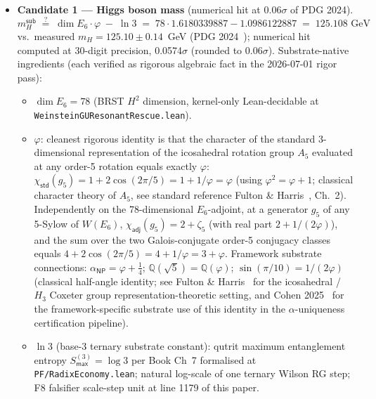 \documentclass[11pt,a4paper]{amsart}
\theoremstyle{plain}
\theoremstyle{definition}
\begin{document}
\begin{itemize}[itemsep=2pt,leftmargin=2em]

\item \textbf{Candidate 1 --- Higgs boson mass} (numerical hit at $0.06\sigma$ of PDG 2024).
\begin{equation*}
m_H^{\textsf{sub}} \;\stackrel{?}{=}\; \dim E_6 \cdot \varphi \;-\; \ln 3 \;=\; 78 \cdot 1.6180339887 - 1.0986122887 \;=\; 125.108\text{ GeV}
\end{equation*}
vs.\ measured $m_H = 125.10 \pm 0.14$~GeV (PDG 2024~\cite{pdg2024}); numerical hit computed at 30-digit precision, 0.0574$\sigma$ (rounded to 0.06$\sigma$).  Substrate-native ingredients (each verified as rigorous algebraic fact in the 2026-07-01 rigor pass):
\begin{itemize}[itemsep=1pt,leftmargin=1.5em]
\item $\dim E_6 = 78$ (BRST $H^2$ dimension, kernel-only Lean-decidable at \texttt{WeinsteinGUResonantRescue.lean}).
\item $\varphi$: cleanest rigorous identity is that the character of the standard 3-dimensional representation of the icosahedral rotation group $A_5$ evaluated at any order-5 rotation equals exactly $\varphi$: $\chi_{\textsf{std}}(g_5) = 1 + 2\cos(2\pi/5) = 1 + 1/\varphi = \varphi$ (using $\varphi^2 = \varphi + 1$; classical character theory of $A_5$, see standard reference Fulton \& Harris~\cite{fulton-harris1991}, Ch.~2). Independently on the 78-dimensional $E_6$-adjoint, at a generator $g_5$ of any 5-Sylow of $W(E_6)$, $\chi_{\textsf{adj}}(g_5) = 2 + \zeta_5$ (with real part $2 + 1/(2\varphi)$), and the sum over the two Galois-conjugate order-5 conjugacy classes equals $4 + 2\cos(2\pi/5) = 4 + 1/\varphi = 3 + \varphi$. Framework substrate connections: $\alpha_{\textsf{NP}} = \varphi + \tfrac{1}{4}$; $\mathbb{Q}(\sqrt{5}) = \mathbb{Q}(\varphi)$; $\sin(\pi/10) = 1/(2\varphi)$ (classical half-angle identity; see Fulton \& Harris~\cite{fulton-harris1991} for the icosahedral / $H_3$ Coxeter group representation-theoretic setting, and Cohen 2025~\cite{cohen2025alphaUniqueness} for the framework-specific substrate use of this identity in the $\alpha$-uniqueness certification pipeline).
\item $\ln 3$ (base-3 ternary substrate constant): qutrit maximum entanglement entropy $S_{\textsf{max}}^{(3)} = \log 3$ per Book Ch~7 formalised at \texttt{PF/RadixEconomy.lean}; natural log-scale of one ternary Wilson RG step; F8 falsifier scale-step unit at line 1179 of this paper.
\end{itemize}

\end{itemize}
\end{document}
